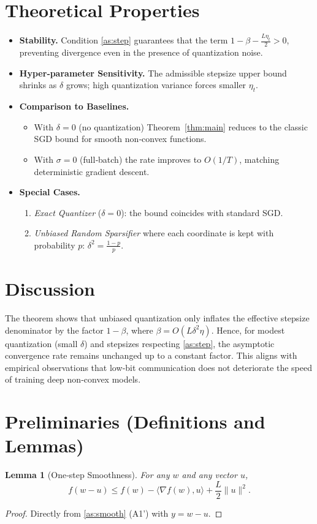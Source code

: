 \documentclass{article}
\newtheorem{lemma}{Lemma}
\begin{document}
\section*{Theoretical Properties}
\begin{itemize}
\item \textbf{Stability.} Condition \ref{as:step} guarantees that the term $1-\beta-\frac{L\eta_{t}}{2}>0$, preventing divergence even in the presence of quantization noise.
\item \textbf{Hyper‑parameter Sensitivity.} The admissible stepsize upper bound shrinks as $\delta$ grows; high quantization variance forces smaller $\eta_{t}$.
\item \textbf{Comparison to Baselines.}
    \begin{itemize}
        \item With $\delta=0$ (no quantization) Theorem~\ref{thm:main} reduces to the classic SGD bound for smooth non‑convex functions.
        \item With $\sigma=0$ (full‑batch) the rate improves to $O(1/T)$, matching deterministic gradient descent.
    \end{itemize}
\item \textbf{Special Cases.}
    \begin{enumerate}
        \item \emph{Exact Quantizer} ($\delta=0$): the bound coincides with standard SGD.
        \item \emph{Unbiased Random Sparsifier} where each coordinate is kept with probability $p$: $\delta^{2}= \frac{1-p}{p}$.
    \end{enumerate}
\end{itemize}

\section*{Discussion}
The theorem shows that unbiased quantization only inflates the effective stepsize denominator by the factor $1-\beta$, where $\beta=O(L\delta^{2}\eta)$. Hence, for modest quantization (small $\delta$) and stepsizes respecting \ref{as:step}, the asymptotic convergence rate remains unchanged up to a constant factor. This aligns with empirical observations that low‑bit communication does not deteriorate the speed of training deep non‑convex models.

\newpage

\section*{Preliminaries (Definitions and Lemmas)}
\begin{lemma}[One‑step Smoothness]\label{lem:smooth}
For any $w$ and any vector $u$,
\[
f(w-u)\le f(w)-\langle\nabla f(w),u\rangle+\frac{L}{2}\|u\|^{2}.
\tag{L1}
\]
\end{lemma}
\begin{proof}
Directly from \ref{as:smooth} (A1') with $y=w-u$.
\end{proof}
\end{document}
